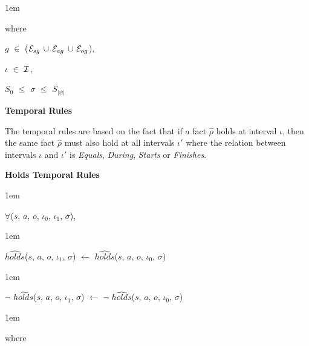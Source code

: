 \documentclass[11pt]{report}
\newenvironment{vquote}
{
  \begin{list}{}{\leftmargin 1em}\item[]
}
{
  \end{list}
}
\begin{document}
\begin{itemize}
              \begin{vquote}
                where

                \hspace{1em}
                $g$ $\in$ (${\cal E}_{sg}$ $\cup$ ${\cal E}_{ag}$ $\cup$ ${\cal E}_{og}$),

                \hspace{1em}
                $\iota$ $\in$ ${\cal I}$,

                \hspace{1em}
                $S_{0}$ $\leq$ $\sigma$ $\leq$ $S_{|\psi|}$
              \end{vquote}

            \item
              {\bf Temporal Rules}

              The temporal rules are based on the fact that if a fact
              $\hat{\rho}$ holds at interval $\iota$, then the same fact
              $\hat{\rho}$ must also hold at all intervals $\iota'$ where
              the relation between intervals $\iota$ and $\iota'$ is
              {\em Equals}, {\em During}, {\em Starts} or {\em Finishes}.

              \begin{itemize}

                \item
                  {\bf Holds Temporal Rules}

                  \begin{vquote}
                    $\forall$($s$, $a$, $o$, $\iota_0$, $\iota_1$, $\sigma$),
                  \end{vquote}

                  \begin{vquote}
                    $\hat{holds}$($s$, $a$, $o$, $\iota_1$, $\sigma$)
                    $\leftarrow$
                    $\hat{holds}$($s$, $a$, $o$, $\iota_0$, $\sigma$)
                  \end{vquote}

                  \begin{vquote}
                    $\lnot$ $\hat{holds}$($s$, $a$, $o$, $\iota_1$, $\sigma$)
                    $\leftarrow$
                    $\lnot$ $\hat{holds}$($s$, $a$, $o$, $\iota_0$, $\sigma$)
                  \end{vquote}

                  \begin{vquote}
                    where


\end{vquote}
\end{itemize}
\end{itemize}
\end{document}

